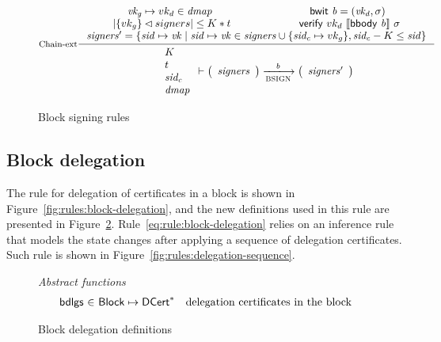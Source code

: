 \begin{figure}
  \begin{equation}
    \label{eq:rule:block-signing}
    \inference[Chain-ext]
    {\var{vk_g} \mapsto vk_d \in \var{dmap} & \bwit{b} = (\var{vk_d}, \sigma)\\
      \size{\{vk_g\} \restrictdom signers} \leq K * t &
      \verify{vk_d}{\serialised{\bbody{b}}}{\sigma} \\
      \var{signers'} =
         \{ \var{sid} \mapsto \var{vk}
          \mid  \var{sid} \mapsto \var{vk} \in \var{signers} \cup \{\var{sid_c} \mapsto vk_g\}
          , \var{sid_c} - K \leq \var{sid} \}
    }
    {
      {\begin{array}{l}
         K\\
         t\\
         \var{sid_c}\\
         \var{dmap}
      \end{array}}
      \vdash
      {
        \left(
          \begin{array}{l}
            \var{signers}
          \end{array}
        \right)
      }
      \trans{BSIGN}{b}
      {
        \left(
          \begin{array}{l}
            \var{signers'}
          \end{array}
        \right)
      }
    }
  \end{equation}
  \caption{Block signing rules}
  \label{fig:rules:block-signing}
\end{figure}

\subsection{Block delegation}
\label{sec:block-delegation}

The rule for delegation of certificates in a block is shown in
Figure~\ref{fig:rules:block-delegation}, and the new definitions used in this
rule are presented in Figure~\ref{fig:defs:block-delegation}.
Rule~\ref{eq:rule:block-delegation} relies on an inference rule that models the
state changes after applying a sequence of delegation certificates. Such rule
is shown in Figure~\ref{fig:rules:delegation-sequence}.

\begin{figure}
  \emph{Abstract functions}
  \begin{equation*}
    \begin{array}{r@{~\in~}lr}
      \fun{bdlgs} & \Block \mapsto \seqof{\DCert} & \text{delegation certificates in the block}\\
    \end{array}
  \end{equation*}
  \caption{Block delegation definitions}
  \label{fig:defs:block-delegation}
\end{figure}

